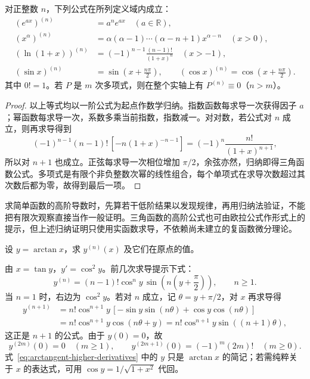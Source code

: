 \documentclass[UTF8,12pt,a4paper,fontset=fandol]{ctexbook}
\begin{document}
\begin{proposition}
\label{prop:standard-higher-derivative-formulas}
对正整数 $n$，下列公式在所列定义域内成立：
\begin{align}
    (e^{ax})^{(n)}&=a^ne^{ax}\quad(a\in\mathbb R),\label{eq:exponential-higher-derivatives}\\
    (x^\alpha)^{(n)}&=\alpha(\alpha-1)\cdots(\alpha-n+1)x^{\alpha-n}
    \quad(x>0),\label{eq:power-higher-derivatives}\\
    (\ln(1+x))^{(n)}&=(-1)^{n-1}\frac{(n-1)!}{(1+x)^n}
    \quad(x>-1),\label{eq:logarithm-higher-derivatives}\\
    (\sin x)^{(n)}&=\sin\left(x+\frac{n\pi}2\right),\qquad
    (\cos x)^{(n)}=\cos\left(x+\frac{n\pi}2\right).
    \label{eq:trigonometric-higher-derivatives}
\end{align}
其中 $0!=1$。若 $P$ 是 $m$ 次多项式，则在整个实轴上有 $P^{(n)}\equiv0$（$n>m$）。
\end{proposition}
\begin{proof}
以上等式均以一阶公式为起点作数学归纳。指数函数每求导一次获得因子 $a$；幂函数每求导一次，系数多乘当前指数，指数减一。对对数，若公式对 $n$ 成立，则再求导得到
\[
    (-1)^{n-1}(n-1)!\,[-n(1+x)^{-n-1}]
    =(-1)^n\frac{n!}{(1+x)^{n+1}},
\]
所以对 $n+1$ 也成立。正弦每求导一次相位增加 $\pi/2$，余弦亦然，归纳即得三角函数公式。多项式是有限个非负整数次幂的线性组合，每个单项式在求导次数超过其次数后都为零，故得到最后一项。
\end{proof}

求简单函数的高阶导数时，先算若干低阶结果以发现规律，再用归纳法验证，不能把有限次观察直接当作一般证明。三角函数的高阶公式也可由欧拉公式作形式上的提示，但上述归纳证明只使用实函数求导，不依赖尚未建立的复函数微分理论。

\begin{example}
\label{ex:arctangent-higher-derivatives}
设 $y=\arctan x$，求 $y^{(n)}(x)$ 及它们在原点的值。
\end{example}
\begin{solve}
由 $x=\tan y$，$y'=\cos^2y$。前几次求导提示下式：
\begin{equation}
\label{eq:arctangent-higher-derivatives}
    y^{(n)}=(n-1)!\cos^ny\,
    \sin\left(n\left(y+\frac\pi2\right)\right),\qquad n\geq1.
\end{equation}
当 $n=1$ 时，右边为 $\cos^2y$。若对 $n$ 成立，记 $\theta=y+\pi/2$，对 $x$ 再求导得
\[
\begin{aligned}
    y^{(n+1)}
    &=n!\cos^{n+1}y\,
      [-\sin y\sin(n\theta)+\cos y\cos(n\theta)]\\
    &=n!\cos^{n+1}y\cos(n\theta+y)
     =n!\cos^{n+1}y\sin((n+1)\theta),
\end{aligned}
\]
这正是 $n+1$ 的公式。由于 $y(0)=0$，故
\[
    y^{(2m)}(0)=0\quad(m\geq1),\qquad
    y^{(2m+1)}(0)=(-1)^m(2m)!\quad(m\geq0).
\]
式~\eqref{eq:arctangent-higher-derivatives} 中的 $y$ 只是 $\arctan x$ 的简记；若需纯粹关于 $x$ 的表达式，可用 $\cos y=1/\sqrt{1+x^2}$ 代回。
\end{solve}
\end{document}
